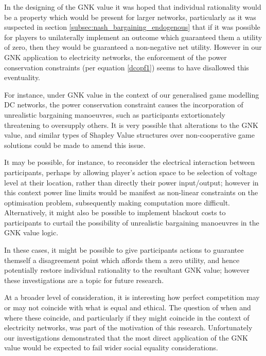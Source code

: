 In the designing of the GNK value it was hoped that individual rationality would be a property which would be present for larger networks, particularly as it was suspected in section \ref{subsec:nash_bargaining_endogenous} that if it was possible for players to unilaterally implement an outcome which guaranteed them a utility of zero, then they would be guaranteed a non-negative net utility.
However in our GNK application to electricity networks, the enforcement of the power conservation constraints (per equation \ref{dcopf1}) seems to have disallowed this eventuality.

For instance, under GNK value in the context of our generalised game modelling DC networks, the power conservation constraint causes the incorporation of unrealistic bargaining manoeuvres, such as participants extortionately threatening to oversupply others.
It is very possible that alterations to the GNK value, and similar types of Shapley Value structures over non-cooperative game solutions could be made to amend this issue.

It may be possible, for instance, to reconsider the electrical interaction between participants, perhaps by allowing player's action space to be selection of voltage level at their location, rather than directly their power input/output; however in this context power line limits would be manifest as non-linear constraints on the optimisation problem, subsequently making computation more difficult.
Alternatively, it might also be possible to implement blackout costs to participants to curtail the possibility of unrealistic bargaining manoeuvres in the GNK value logic.

In these cases, it might be possible to give participants actions to guarantee themself a disagreement point which affords them a zero utility, and hence potentially restore individual rationality to the resultant GNK value; however these investigations are a topic for future research.

At a broader level of consideration, it is interesting how perfect competition may or may not coincide with what is equal and ethical.
The question of when and where these coincide, and particularly if they might coincide in the context of electricity networks, was part of the motivation of this research.
Unfortunately our investigations demonstrated that the most direct application of the GNK value would be expected to fail wider social equality considerations.



\DIFaddbegin \subsection{}\label{sec:GNK_extensions_discussion}

